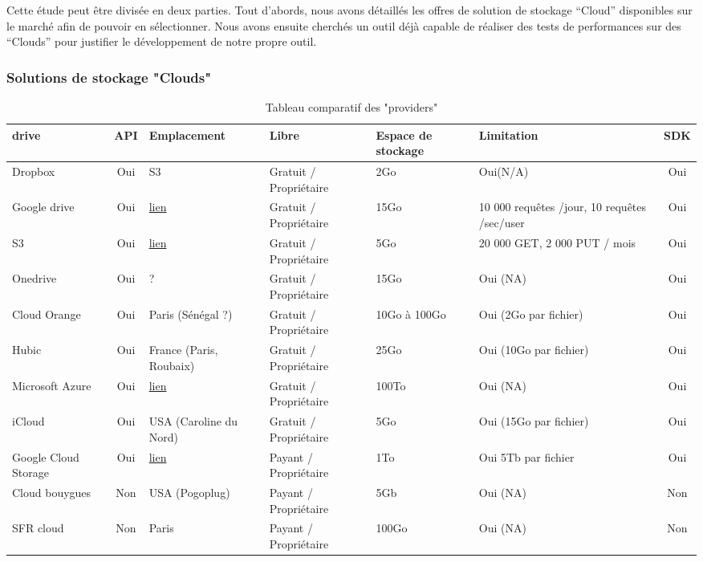 \documentclass[10pt]{article}
\begin{document}
Cette étude peut être divisée en deux parties. Tout d’abords, nous
avons détaillés les offres de solution de stockage “Cloud” disponibles
sur le marché afin de pouvoir en sélectionner. Nous avons ensuite
cherchés un outil déjà capable de réaliser des tests de performances
sur des “Clouds” pour justifier le développement de notre propre
outil.

\subsubsection{Solutions de stockage "Clouds"}
\begin{table}[!h]
\caption{Tableau comparatif des "providers"}
\renewcommand{\arraystretch}{1.5}
\begin{center}
\begin{tabular}{|m{1in}|c|m{1in}|m{1in}|m{1in}|m{1in}|c|}
 \hline
 \bf\centering drive & \bf API & \bf Emplacement & \bf Libre & \bf\centering Espace de stockage & \bf Limitation & \bf SDK\\
 \hline
 \centering Dropbox & Oui & S3 & Gratuit / Propriétaire & 2Go & Oui(N/A) & Oui \\
 \hline
  \centering Google drive & Oui  & \href{http://www.google.com/about/datacenters/inside/locations/index.html}{lien} & Gratuit / Propriétaire & 15Go & 10 000 requêtes /jour, 10 requêtes /sec/user & Oui \\
 \hline
  \centering S3 & Oui  &  \href{http://aws.amazon.com/fr/about-aws/global-infrastructure/}{lien} & Gratuit / Propriétaire & 5Go & 20 000 GET, 2 000 PUT / mois & Oui \\
 \hline
  \centering Onedrive & Oui  & ? & Gratuit / Propriétaire & 15Go & Oui (NA) & Oui \\
 \hline
  \centering Cloud Orange & Oui  & Paris (Sénégal ?) & Gratuit / Propriétaire & 10Go à 100Go & Oui (2Go par fichier) & Oui \\
 \hline
  \centering Hubic & Oui  & France (Paris, Roubaix) & Gratuit / Propriétaire & 25Go & Oui (10Go par fichier) & Oui \\
 \hline
  \centering Microsoft Azure & Oui  &  \href{http://azure.microsoft.com/en-us/regions/}{lien} & Gratuit / Propriétaire & 100To & Oui (NA) & Oui \\
 \hline
  \centering iCloud & Oui  & USA (Caroline du Nord) & Gratuit / Propriétaire & 5Go & Oui (15Go par fichier) & Oui \\
 \hline
  \centering Google Cloud Storage & Oui  &  \href{http://www.google.com/about/datacenters/inside/locations/index.html}{lien}  & Payant  / Propriétaire & 1To & Oui 5Tb par fichier & Oui \\
 \hline
  \centering Cloud bouygues & Non  & USA (Pogoplug) & Payant  / Propriétaire & 5Gb & Oui (NA) & Non \\
 \hline
  \centering SFR cloud & Non & Paris & Payant / Propriétaire & 100Go & Oui (NA) & Non \\
 \hline
\end{tabular}
\end{center}
\end{table}
\end{document}
